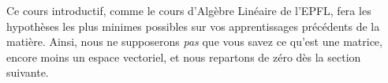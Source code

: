 \noindent Ce cours introductif, comme le cours d'Algèbre Linéaire de l'EPFL, fera les hypothèses les plus minimes possibles sur vos apprentissages précédents de la matière. Ainsi, nous ne supposerons \textit{pas} que vous savez ce qu'est une matrice, encore moins un espace vectoriel, et nous repartons de zéro dès la section suivante.\\